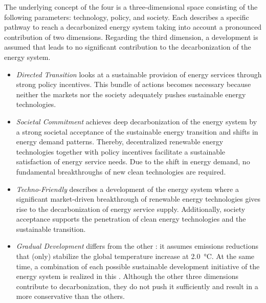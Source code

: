 The underlying concept of the four  is a three-dimensional space consisting of the following parameters: technology, policy, and society. Each  describes a specific pathway to reach a decarbonized energy system taking into account a pronounced contribution of two dimensions. Regarding the third dimension, a development is assumed that leads to no significant contribution to the decarbonization of the energy system. 

\begin{itemize}
	\item \textit{Directed Transition} looks at a sustainable provision of energy services through strong policy incentives. This bundle of actions becomes necessary because neither the markets nor the society adequately pushes sustainable energy technologies.
	\item \textit{Societal Commitment} achieves deep decarbonization of the energy system by a strong societal acceptance of the sustainable energy transition and shifts in energy demand patterns. Thereby, decentralized renewable energy technologies together with policy incentives facilitate a sustainable satisfaction of energy service needs. Due to the shift in energy demand, no fundamental breakthroughs of new clean technologies are required.
	\item \textit{Techno-Friendly} describes a development of the energy system where a significant market-driven breakthrough of renewable energy technologies gives rise to the decarbonization of energy service supply. Additionally, society acceptance supports the penetration of clean energy technologies and the sustainable transition.
	\item \textit{Gradual Development} differs from the other : it assumes emissions reductions that (only) stabilize the global temperature increase at \SI{2.0}{\degreeCelsius}. At the same time, a combination of each possible sustainable development initiative of the energy system is realized in this . Although the other three dimensions contribute to decarbonization, they do not push it sufficiently and result in a more conservative  than the others.
\end{itemize}


